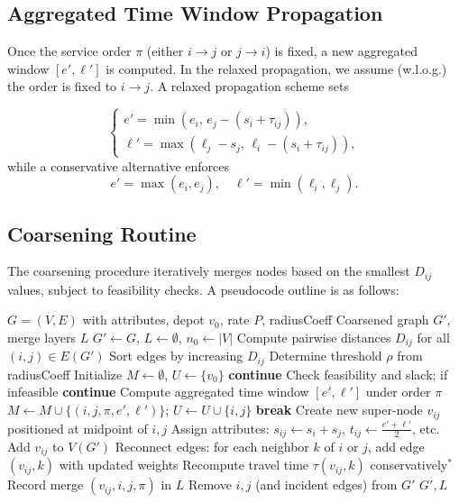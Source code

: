 \documentclass[conference]{IEEEtran}
\begin{document}
\subsection{Aggregated Time Window Propagation}
Once the service order $\pi$ (either $i \to j$ or $j \to i$) is fixed, a new aggregated window $[e',\ell']$ is computed. In the relaxed propagation, we assume (w.l.o.g.) the order is fixed to $i \to j$. A relaxed propagation scheme sets



\[
\begin{cases}
  e' = \min(e_i,\, e_j - (s_i + \tau_{ij})), \\
  \ell' = \max(\ell_j - s_j,\, \ell_i - (s_i + \tau_{ij})),
\end{cases}
\]
while a conservative alternative enforces
\[
e' = \max(e_i, e_j), \quad \ell' = \min(\ell_i, \ell_j).
\]

\subsection{Coarsening Routine}
The coarsening procedure iteratively merges nodes based on the smallest $D_{ij}$ values, subject to feasibility checks. A pseudocode outline is as follows:

\begin{algorithmic}[1]
\Require $G=(V,E)$ with attributes, depot $v_{0}$, rate $P$, radiusCoeff
\Ensure Coarsened graph $G'$, merge layers $L$
\State $G' \gets G$, $L \gets \emptyset$, $n_0 \gets |V|$
  \State Compute pairwise distances $D_{ij}$ for all $(i,j)\in E(G')$
  \State Sort edges by increasing $D_{ij}$
  \State Determine threshold $\rho$ from radiusCoeff
  \State Initialize $M \gets \emptyset$, $U \gets \{v_{0}\}$ 
     \textbf{continue} \EndIf
    \State Check feasibility and slack; if infeasible \textbf{continue}
    \State Compute aggregated time window $[e',\ell']$ under order $\pi$
    \State $M \gets M \cup \{(i,j,\pi,e',\ell')\}$; $U \gets U \cup \{i,j\}$
  \EndFor
   \textbf{break} \EndIf
    \State Create new super-node $v_{ij}$ positioned at midpoint of $i,j$
    \State Assign attributes: $s_{ij} \gets s_i + s_j$, $t_{ij} \gets \tfrac{e'+\ell'}{2}$, etc.
    \State Add $v_{ij}$ to $V(G')$
    \State Reconnect edges: for each neighbor $k$ of $i$ or $j$, add edge $(v_{ij},k)$ with updated weights \State Recompute travel time $\tau(v_{ij},k)$ conservatively$^{*}$
    \State Record merge $(v_{ij},i,j,\pi)$ in $L$
    \State Remove $i,j$ (and incident edges) from $G'$
  \EndFor
\EndWhile
\State \Return $G',L$
\end{algorithmic}
\end{document}
